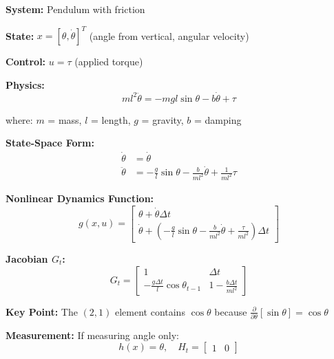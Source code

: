 \begin{tcolorbox}[colback=blue!5!white,colframe=blue!75!black,title=Simple Pendulum]

\textbf{System:} Pendulum with friction

\textbf{State:} $x = [\theta, \dot{\theta}]^T$ (angle from vertical, angular velocity)

\textbf{Control:} $u = \tau$ (applied torque)

\textbf{Physics:}
\begin{equation}
ml^2 \ddot{\theta} = -mgl\sin\theta - b\dot{\theta} + \tau
\end{equation}

where: $m$ = mass, $l$ = length, $g$ = gravity, $b$ = damping

\textbf{State-Space Form:}
\begin{align}
\dot{\theta} &= \dot{\theta} \\
\ddot{\theta} &= -\frac{g}{l}\sin\theta - \frac{b}{ml^2}\dot{\theta} + \frac{1}{ml^2}\tau
\end{align}

\textbf{Nonlinear Dynamics Function:}
\begin{equation}
g(x, u) = \begin{bmatrix}
\theta + \dot{\theta} \Delta t \\
\dot{\theta} + \left(-\frac{g}{l}\sin\theta - \frac{b}{ml^2}\dot{\theta} + \frac{\tau}{ml^2}\right) \Delta t
\end{bmatrix}
\end{equation}

\textbf{Jacobian $G_t$:}
\begin{equation}
G_t = \begin{bmatrix}
1 & \Delta t \\[5pt]
-\frac{g\Delta t}{l}\cos\theta_{t-1} & 1 - \frac{b\Delta t}{ml^2}
\end{bmatrix}
\end{equation}

\textbf{Key Point:} The $(2,1)$ element contains $\cos\theta$ because $\frac{\partial}{\partial\theta}[\sin\theta] = \cos\theta$

\textbf{Measurement:} If measuring angle only:
\begin{equation}
h(x) = \theta, \quad H_t = \begin{bmatrix} 1 & 0 \end{bmatrix}
\end{equation}

\end{tcolorbox}

